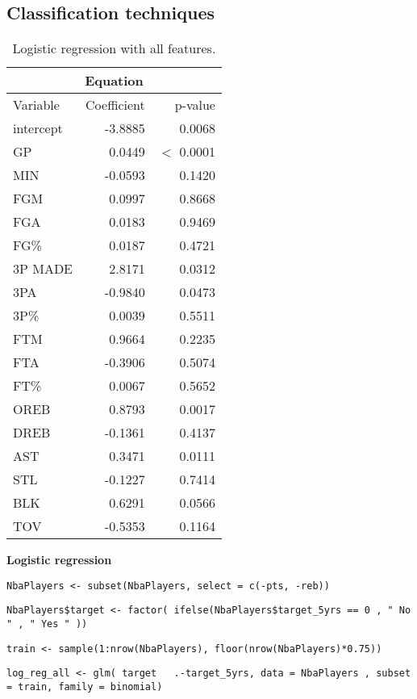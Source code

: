 \subsection*{Classification techniques}\label{appendix:ct}

\begin{table}[H]
	\centering
	\begin{tabular}{|| l | r | r ||} 
		\hline
		\multicolumn{3}{|c|}{Equation} \\
		\hline
		Variable & Coefficient & p-value \\
		\hline
		intercept & -3.8885 & 0.0068 \\
		GP & 0.0449 & $<$ 0.0001 \\
		MIN & -0.0593 & 0.1420 \\
		FGM & 0.0997 & 0.8668 \\
		FGA & 0.0183 & 0.9469 \\
		FG\% & 0.0187 & 0.4721 \\
		3P MADE & 2.8171 & 0.0312 \\
		3PA & -0.9840 & 0.0473 \\
		3P\% & 0.0039 & 0.5511 \\
		FTM & 0.9664 & 0.2235 \\
		FTA & -0.3906 & 0.5074 \\
		FT\% & 0.0067 & 0.5652 \\
		OREB & 0.8793 & 0.0017 \\
		DREB & -0.1361 & 0.4137 \\
		AST & 0.3471 & 0.0111 \\
		STL & -0.1227 & 0.7414 \\
		BLK & 0.6291 & 0.0566 \\				
		TOV & -0.5353 & 0.1164 \\		
		\hline
	\end{tabular}
	\caption{Logistic regression with all features.}
	\label{table:LRAllSum}
\end{table}

\noindent
\textbf{Logistic regression}

\texttt{NbaPlayers <- subset(NbaPlayers, select = c(-pts, -reb))}

\texttt{NbaPlayers\$target <- factor( ifelse(NbaPlayers\$target\_5yrs == 0 , " No " , " Yes " ))}

\texttt{train <- sample(1:nrow(NbaPlayers), floor(nrow(NbaPlayers)*0.75))}

\texttt{log\_reg\_all <- glm( target ~ .-target\_5yrs, data = NbaPlayers , subset = train, family = binomial)}

